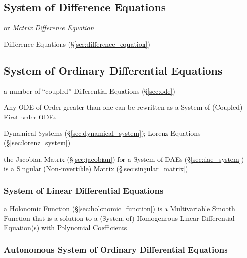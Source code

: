 \subsection{System of Difference Equations}
\label{sec:difference_equation_system}

or \emph{Matrix Difference Equation}

Difference Equations (\S\ref{sec:difference_equation})



\subsection{System of Ordinary Differential Equations}\label{sec:ode_system}

a number of ``coupled'' Differential Equations (\S\ref{sec:ode})

Any ODE of Order greater than one can be rewritten as a System of (Coupled)
First-order ODEs.

\fist Dynamical Systems (\S\ref{sec:dynamical_system}); Lorenz Equations
(\S\ref{sec:lorenz_system})

\fist the Jacobian Matrix (\S\ref{sec:jacobian}) for a System of DAEs
(\S\ref{sec:dae_system}) is a Singular (Non-invertible) Matrix
(\S\ref{sec:singular_matrix})



\subsubsection{System of Linear Differential Equations}
\label{sec:linear_ode_system}

a Holonomic Function (\S\ref{sec:holonomic_function}) is a Multivariable Smooth
Function that is a solution to a (System of) Homogeneous Linear Differential
Equation(s) with Polynomial Coefficients



\subsubsection{Autonomous System of Ordinary Differential Equations}
\label{sec:autonomous_ode_system}

